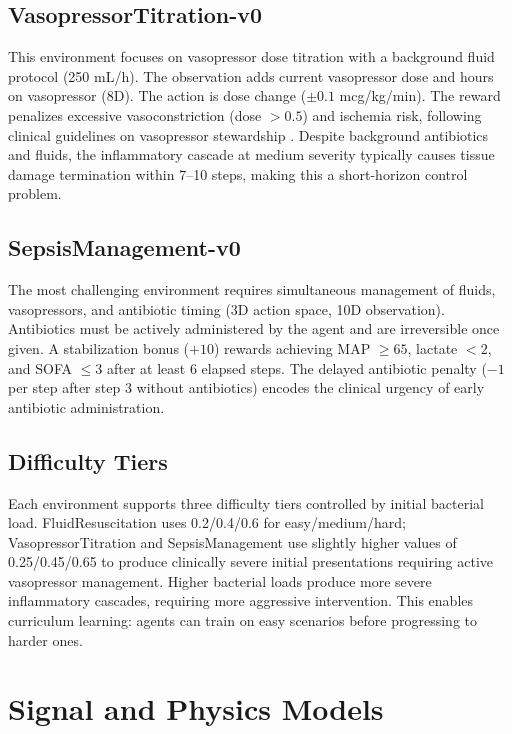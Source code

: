 \documentclass[11pt,a4paper]{article}
\begin{document}
\subsection{VasopressorTitration-v0}

This environment focuses on vasopressor dose titration with a background fluid protocol (250 mL/h). The observation adds current vasopressor dose and hours on vasopressor (8D). The action is dose change ($\pm 0.1$ mcg/kg/min). The reward penalizes excessive vasoconstriction (dose $> 0.5$) and ischemia risk, following clinical guidelines on vasopressor stewardship \citep{scheeren2019current}. Despite background antibiotics and fluids, the inflammatory cascade at medium severity typically causes tissue damage termination within 7--10 steps, making this a short-horizon control problem.

\subsection{SepsisManagement-v0}

The most challenging environment requires simultaneous management of fluids, vasopressors, and antibiotic timing (3D action space, 10D observation). Antibiotics must be actively administered by the agent and are irreversible once given. A stabilization bonus ($+10$) rewards achieving MAP $\geq 65$, lactate $< 2$, and SOFA $\leq 3$ after at least 6 elapsed steps. The delayed antibiotic penalty ($-1$ per step after step 3 without antibiotics) encodes the clinical urgency of early antibiotic administration.

\subsection{Difficulty Tiers}

Each environment supports three difficulty tiers controlled by initial bacterial load. FluidResuscitation uses 0.2/0.4/0.6 for easy/medium/hard; VasopressorTitration and SepsisManagement use slightly higher values of 0.25/0.45/0.65 to produce clinically severe initial presentations requiring active vasopressor management. Higher bacterial loads produce more severe inflammatory cascades, requiring more aggressive intervention. This enables curriculum learning: agents can train on easy scenarios before progressing to harder ones.

\section{Signal and Physics Models}
\end{document}
